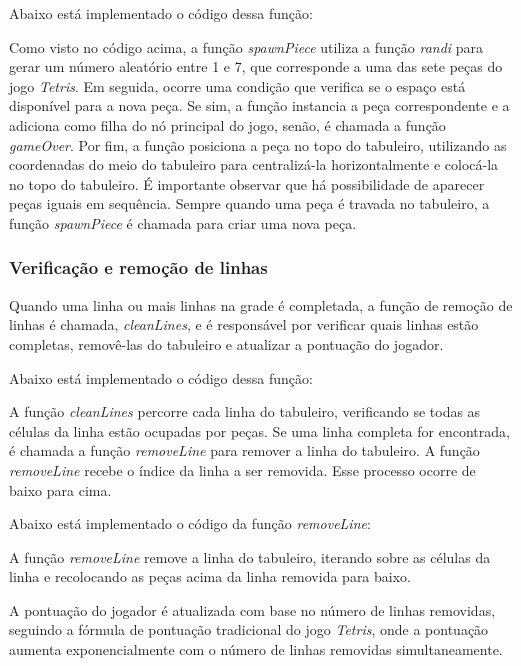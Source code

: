 Abaixo está  implementado o código dessa função:
 

Como visto no código acima, a função \textit{spawnPiece} utiliza a função \textit{randi} para gerar um número aleatório entre 1 e 7, que corresponde a uma das sete peças do jogo \textit{Tetris}. Em seguida, ocorre uma condição que verifica se o espaço está disponível para a nova peça. Se sim, a função instancia a peça correspondente e a adiciona como filha do nó principal do jogo, senão, é chamada a função \textit{gameOver}. Por fim, a função posiciona a peça no topo do tabuleiro, utilizando as coordenadas do meio do tabuleiro para centralizá-la horizontalmente e colocá-la no topo do tabuleiro.
É importante observar que há possibilidade de aparecer peças iguais em sequência.
Sempre quando uma peça é travada no tabuleiro, a função \textit{spawnPiece} é chamada para criar uma nova peça.

\subsubsection{Verificação e remoção de linhas}

Quando uma linha ou mais linhas na grade é completada, a função de remoção de linhas é chamada, \textit{cleanLines}, e é responsável por verificar quais linhas estão completas, removê-las do tabuleiro e atualizar a pontuação do jogador. 

Abaixo está implementado o código dessa função:


A função \textit{cleanLines} percorre cada linha do tabuleiro, verificando se todas as células da linha estão ocupadas por peças. Se uma linha completa for encontrada, 
é chamada a função \textit{removeLine} para remover a linha do tabuleiro. A função \textit{removeLine} recebe o índice da linha a ser removida. Esse processo ocorre de baixo para cima. 

Abaixo está implementado o código da função \textit{removeLine}:



A função \textit{removeLine} remove a linha do tabuleiro, iterando sobre as células da linha e recolocando as peças acima da linha removida para baixo.

A pontuação do jogador é atualizada com base no número de linhas removidas, seguindo a fórmula de pontuação tradicional do jogo \textit{Tetris}, onde a pontuação aumenta exponencialmente com o número de linhas removidas simultaneamente.

